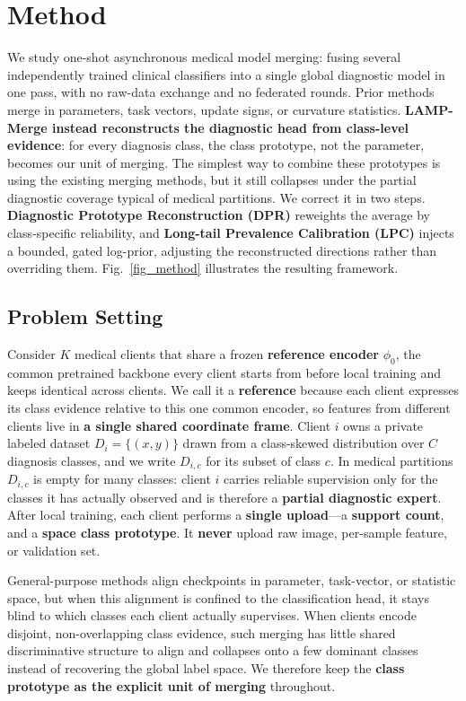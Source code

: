 \documentclass[letterpaper]{article} %
\begin{document}
\section{Method}
We study one-shot asynchronous medical model merging: fusing several independently trained clinical classifiers into a single global diagnostic model in one pass, with no raw-data exchange and no federated rounds. Prior methods merge in parameters, task vectors, update signs, or curvature statistics. \textbf{LAMP-Merge instead reconstructs the diagnostic head from class-level evidence}: for every diagnosis class, the class prototype, not the parameter, becomes our unit of merging. The simplest way to combine these prototypes is using the existing merging methods, but it still collapses under the partial diagnostic coverage typical of medical partitions. We correct it in two steps. \textbf{Diagnostic Prototype Reconstruction (DPR)} reweights the average by class-specific reliability, and \textbf{Long-tail Prevalence Calibration (LPC)} injects a bounded, gated log-prior, adjusting the reconstructed directions rather than overriding them. Fig.~\ref{fig_method} illustrates the resulting framework.


\subsection{Problem Setting}

Consider $K$ medical clients that share a frozen \textbf{reference encoder} $\phi_0$, the common pretrained backbone every client starts from before local training and keeps identical across clients. We call it a \textbf{reference} because each client expresses its class evidence relative to this one common encoder, so features from different clients live in \textbf{a single shared coordinate frame}. Client $i$ owns a private labeled dataset $D_i=\{(x,y)\}$ drawn from a class-skewed distribution over $C$ diagnosis classes, and we write $D_{i,c}$ for its subset of class $c$. In medical partitions $D_{i,c}$ is empty for many classes: client $i$ carries reliable supervision only for the classes it has actually observed and is therefore a \textbf{partial diagnostic expert}. After local training, each client performs a \textbf{single upload}---a \textbf{support count}, and a \textbf{space class prototype}. It \textbf{never} upload raw image, per-sample feature, or validation set.

General-purpose methods align checkpoints in parameter, task-vector, or statistic space, but when this alignment is confined to the classification head, it stays blind to which classes each client actually supervises. When clients encode disjoint, non-overlapping class evidence, such merging has little shared discriminative structure to align and collapses onto a few dominant classes instead of recovering the global label space. We therefore keep the \textbf{class prototype as the explicit unit of merging} throughout.
\end{document}
